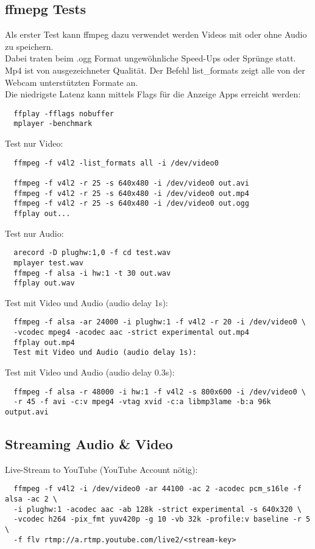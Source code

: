 \subsection{ffmepg Tests}
Als erster Test kann ffmpeg dazu verwendet werden Videos mit oder ohne Audio zu speichern.\\
Dabei traten beim .ogg Format ungewöhnliche Speed-Ups oder Sprünge statt. Mp4 ist von 
ausgezeichneter Qualität. Der Befehl list\_formats zeigt alle von der Webcam unterstützten 
Formate an.\\

Die niedrigste Latenz kann mittels Flags für die Anzeige Apps erreicht werden:
\begin{verbatim}
  ffplay -fflags nobuffer 
  mplayer -benchmark
\end{verbatim}

Test nur Video:
\begin{verbatim}
  ffmpeg -f v4l2 -list_formats all -i /dev/video0

  ffmpeg -f v4l2 -r 25 -s 640x480 -i /dev/video0 out.avi
  ffmpeg -f v4l2 -r 25 -s 640x480 -i /dev/video0 out.mp4
  ffmpeg -f v4l2 -r 25 -s 640x480 -i /dev/video0 out.ogg
  ffplay out...
\end{verbatim}

Test nur Audio:
\begin{verbatim}
  arecord -D plughw:1,0 -f cd test.wav
  mplayer test.wav
  ffmpeg -f alsa -i hw:1 -t 30 out.wav
  ffplay out.wav
\end{verbatim}

Test mit Video und Audio (audio delay 1s):
\begin{verbatim}
  ffmpeg -f alsa -ar 24000 -i plughw:1 -f v4l2 -r 20 -i /dev/video0 \
  -vcodec mpeg4 -acodec aac -strict experimental out.mp4
  ffplay out.mp4
  Test mit Video und Audio (audio delay 1s):
\end{verbatim}
Test mit Video und Audio (audio delay 0.3s):
\begin{verbatim}
  ffmpeg -f alsa -r 48000 -i hw:1 -f v4l2 -s 800x600 -i /dev/video0 \
  -r 45 -f avi -c:v mpeg4 -vtag xvid -c:a libmp3lame -b:a 96k output.avi
\end{verbatim}

\subsection{Streaming Audio \& Video}
Live-Stream to YouTube (YouTube Account nötig):
\begin{verbatim}
  ffmpeg -f v4l2 -i /dev/video0 -ar 44100 -ac 2 -acodec pcm_s16le -f alsa -ac 2 \
  -i plughw:1 -acodec aac -ab 128k -strict experimental -s 640x320 \
  -vcodec h264 -pix_fmt yuv420p -g 10 -vb 32k -profile:v baseline -r 5 \ 
  -f flv rtmp://a.rtmp.youtube.com/live2/<stream-key>
\end{verbatim}

